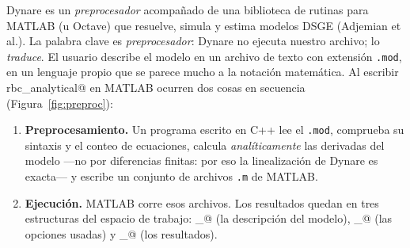 \documentclass[11pt,a4paper]{report}
\newcommand{\code}[1]{\texttt{#1}}
\begin{document}
Dynare es un \emph{preprocesador} acompañado de una biblioteca de rutinas para MATLAB
(u Octave) que resuelve, simula y estima modelos DSGE (Adjemian et al.). La palabra
clave es \emph{preprocesador}: Dynare no ejecuta nuestro archivo; lo \emph{traduce}.
El usuario describe el modelo en un archivo de texto con extensión \code{.mod}, en un
lenguaje propio que se parece mucho a la notación matemática. Al escribir
\lstinline@dynare rbc_analytical@ en MATLAB ocurren dos cosas en secuencia
(Figura~\ref{fig:preproc}):
\begin{enumerate}[leftmargin=1.6em, itemsep=2pt, topsep=2pt]
\item \textbf{Preprocesamiento.} Un programa escrito en C++ lee el \code{.mod},
  comprueba su sintaxis y el conteo de ecuaciones, calcula \emph{analíticamente} las
  derivadas del modelo ---no por diferencias finitas: por eso la linealización de
  Dynare es exacta--- y escribe un conjunto de archivos \code{.m} de MATLAB.
\item \textbf{Ejecución.} MATLAB corre esos archivos. Los resultados quedan en tres
  estructuras del espacio de trabajo: \lstinline@M_@ (la descripción del modelo),
  \lstinline@options_@ (las opciones usadas) y \lstinline@oo_@ (los resultados).
\end{enumerate}
\end{document}
